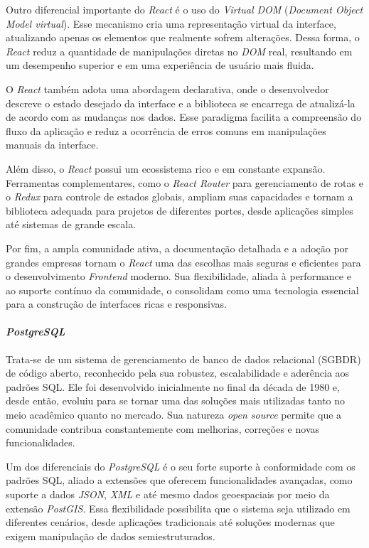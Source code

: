\documentclass[english,brazilian]{UNISINOSartigo} %
\begin{document}
Outro diferencial importante do \textit{React} é o uso do \textit{Virtual DOM} (\textit{Document Object Model virtual}). Esse mecanismo cria uma representação virtual da interface, atualizando apenas os elementos que realmente sofrem alterações. Dessa forma, o \textit{React} reduz a quantidade de manipulações diretas no \textit{DOM} real, resultando em um desempenho superior e em uma experiência de usuário mais fluida.

O \textit{React} também adota uma abordagem declarativa, onde o desenvolvedor descreve o estado desejado da interface e a biblioteca se encarrega de atualizá-la de acordo com as mudanças nos dados. Esse paradigma facilita a compreensão do fluxo da aplicação e reduz a ocorrência de erros comuns em manipulações manuais da interface.

Além disso, o \textit{React} possui um ecossistema rico e em constante expansão. Ferramentas complementares, como o \textit{React Router} para gerenciamento de rotas e o \textit{Redux} para controle de estados globais, ampliam suas capacidades e tornam a biblioteca adequada para projetos de diferentes portes, desde aplicações simples até sistemas de grande escala.

Por fim, a ampla comunidade ativa, a documentação detalhada e a adoção por grandes empresas tornam o \textit{React} uma das escolhas mais seguras e eficientes para o desenvolvimento \textit{Frontend} moderno. Sua flexibilidade, aliada à performance e ao suporte contínuo da comunidade, o consolidam como uma tecnologia essencial para a construção de interfaces ricas e responsivas.

\paragraph{\textit{PostgreSQL}}

Trata-se de um sistema de gerenciamento de banco de dados relacional (SGBDR) de código aberto, reconhecido pela sua robustez, escalabilidade e aderência aos padrões SQL. Ele foi desenvolvido inicialmente no final da década de 1980 e, desde então, evoluiu para se tornar uma das soluções mais utilizadas tanto no meio acadêmico quanto no mercado. Sua natureza \textit{open source} permite que a comunidade contribua constantemente com melhorias, correções e novas funcionalidades.

Um dos diferenciais do \textit{PostgreSQL} é o seu forte suporte à conformidade com os padrões SQL, aliado a extensões que oferecem funcionalidades avançadas, como suporte a dados \textit{JSON}, \textit{XML} e até mesmo dados geoespaciais por meio da extensão \textit{PostGIS}. Essa flexibilidade possibilita que o sistema seja utilizado em diferentes cenários, desde aplicações tradicionais até soluções modernas que exigem manipulação de dados semiestruturados.
\end{document}
